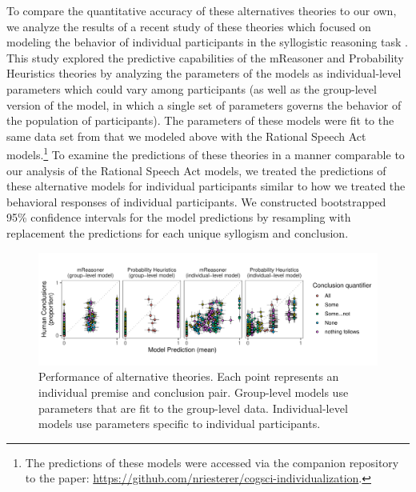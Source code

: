 \documentclass[floatsintext, doc]{apa6}
\begin{document}
To compare the quantitative accuracy of these alternatives theories to our own, we analyze the results of a recent study of these theories which focused on modeling the behavior of individual participants in the syllogistic reasoning task \cite{riesterer2020models}.
This study explored the predictive capabilities of the mReasoner and Probability Heuristics theories by analyzing the parameters of the models as individual-level parameters which could vary among participants (as well as the group-level version of the model, in which a single set of parameters governs the behavior of the population of participants). 
The parameters of these models were fit to the same data set from  that we modeled above with the Rational Speech Act models.\footnote{The predictions of these models were accessed via the companion repository to the paper: \url{https://github.com/nriesterer/cogsci-individualization}.}
To examine the predictions of these theories in a manner comparable to our analysis of the Rational Speech Act models, we treated the predictions of these alternative models for individual participants similar to how we treated the behavioral responses of individual participants. 
We constructed bootstrapped 95\% confidence intervals for the model predictions by resampling with replacement the predictions for each unique syllogism and conclusion. 

\begin{figure}[t]
\centering
\includegraphics[width = \textwidth]{figs/alternative_model_scatters.pdf}
\caption{Performance of alternative theories. Each point represents an individual premise and conclusion pair. Group-level models use parameters that are fit to the group-level data. Individual-level models use parameters specific to individual participants. }
\label{fig:altModels}
\end{figure}

\end{document}

